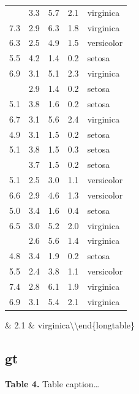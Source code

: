 \documentclass[
]{article}
\begin{document}
\begin{longtable}[t]{rrrrl}
\addlinespace
6.7 & 3.3 & 5.7 & 2.1 & virginica\\
7.3 & 2.9 & 6.3 & 1.8 & virginica\\
6.3 & 2.5 & 4.9 & 1.5 & versicolor\\
5.5 & 4.2 & 1.4 & 0.2 & setosa\\
6.9 & 3.1 & 5.1 & 2.3 & virginica\\
\addlinespace
4.4 & 2.9 & 1.4 & 0.2 & setosa\\
5.1 & 3.8 & 1.6 & 0.2 & setosa\\
6.7 & 3.1 & 5.6 & 2.4 & virginica\\
4.9 & 3.1 & 1.5 & 0.2 & setosa\\
5.1 & 3.8 & 1.5 & 0.3 & setosa\\
\addlinespace
5.4 & 3.7 & 1.5 & 0.2 & setosa\\
5.1 & 2.5 & 3.0 & 1.1 & versicolor\\
6.6 & 2.9 & 4.6 & 1.3 & versicolor\\
5.0 & 3.4 & 1.6 & 0.4 & setosa\\
6.5 & 3.0 & 5.2 & 2.0 & virginica\\
\addlinespace
6.1 & 2.6 & 5.6 & 1.4 & virginica\\
4.8 & 3.4 & 1.9 & 0.2 & setosa\\
5.5 & 2.4 & 3.8 & 1.1 & versicolor\\
7.4 & 2.8 & 6.1 & 1.9 & virginica\\
6.9 & 3.1 & 5.4 & 2.1 & virginica\\*
\end{longtable}

\& 2.1 \& virginica\textbackslash* \textbackslash end\{longtable\}

\hypertarget{gt}{%
\subsection{gt}\label{gt}}

\textbf{Table 4.} Table caption\ldots{}
\end{document}
